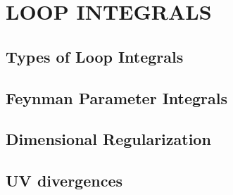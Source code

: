 \chapter{LOOP INTEGRALS}

\section{Types of Loop Integrals}
\section{Feynman Parameter Integrals}
\section{Dimensional Regularization}
\section{UV divergences}

\newpage